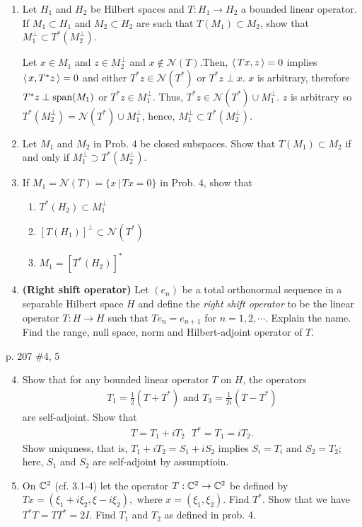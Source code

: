 \documentclass[10pt,a4paper]{report}
\begin{document}
\begin{enumerate}
	\item Let $H_1$ and $H_2$ be Hilbert spaces and $T: H_1 \to H_2$ a bounded linear operator.  If $M_1\subset H_1$ and $M_2 \subset H_2$ are such that $T(M_1) \subset M_2$, show that $M_1^\perp \subset T^*(M_2^\perp)$.
	
	 Let $x \in M_1$ and $z \in M_2^\perp$ and $x \not \in \mathcal{N}(T)$.Then, $\left \langle\, Tx, z \,\right \rangle=0$ implies $\left \langle\, x, T^*z \,\right \rangle=0$ and either $T^*z \in \mathcal{N}(T^*)$ or $T^*z \perp x$.  $x$ is arbitrary, therefore $T^*z \perp \operatorname{span}(M_1)$ or $T^*z \in M_1^\perp$.  Thus, $T^*z \in \mathcal{N}(T^*) \cup M_1^\perp$.  $z$ is arbitrary so $T^*(M_2^\perp) = \mathcal{N}(T^*) \cup M_1^\perp$, hence, $M_1^\perp \subset T^*(M_2^\perp)$.
	
	\item Let $M_1$ and $M_2$ in Prob. 4 be closed subspaces.   Show that $T(M_1)\subset M_2$ if and only if $M_1^\perp \supset T^*(M_2^\perp)$.
	
	\item If $M_1=\mathcal{N}(T)=\{x\,|\,Tx=0\}$ in Prob. 4, show that 
	\begin{enumerate}
		\item $T^*(H_2) \subset M_1^\perp$
		\item $[T(H_1)]^\perp \subset \mathcal{N}(T^*)$
		\item $M_1=[T^*(H_2)]^*$
	\end{enumerate}
	\setcounter{enumi}{9}
	\item \textbf{(Right shift operator)} Let $(e_n)$ be a total orthonormal sequence in a separable Hilbert space $H$ and define the \textit{right shift operator} to be the linear operator $T: H \to H$ such that $Te_n=e_{n+1}$ for $n=1,2,\cdots$.  Explain the name.  Find the range, null space, norm and Hilbert-adjoint operator of $T$.

\end{enumerate}

\newpage
p. 207 \#4, 5

\begin{enumerate}
	\setcounter{enumi}{3}
	\item Show that for any bounded linear operator $T$ on $H$, the operators 
	\begin{align*}
		T_1=\frac{1}{2}(T+T^*) \text{  and  } T_3=\frac{1}{2i}(T-T^*)
	\end{align*}are self-adjoint.  Show that 
	\begin{align*}
		T=T_1+iT_2 \text{      } T^*=T_1=iT_2.
	\end{align*}Show uniquness, that is, $T_1+iT_2=S_1+iS_2$ implies $S_i=T_i$ and $S_2=T_2$; here, $S_1$ and $S_2$ are self-adjoint by assumptioin.
	
	\item On $\mathbb{C}^2$ (cf. 3.1-4) let the operator $T: \mathbb{C}^2\to \mathbb{C}^2$ be defined by $Tx=(\xi_1+i\xi_2, \xi-i\xi_2),$ where $x=(\xi_1,\xi_2)$.  Find $T^*$.  Show that we have $T^*T=TT^*=2I$.  Find $T_1$ and $T_2$ as defined in prob. 4.

\end{enumerate}
\end{document}
